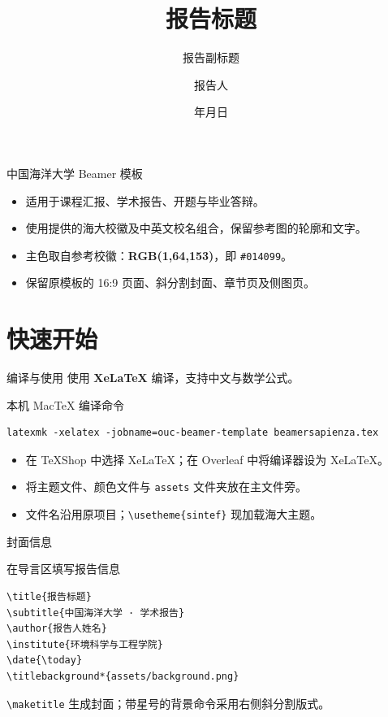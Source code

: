 \documentclass{beamer}
\title{报告标题}
\subtitle{报告副标题}
\author{报告人}
\institute{环境科学与工程学院}
\date{\number\year 年\number\month 月\number\day 日}
\begin{document}
\maketitle

\begin{frame}{中国海洋大学 Beamer 模板}
\begin{itemize}
  \item 适用于课程汇报、学术报告、开题与毕业答辩。
  \item 使用提供的海大校徽及中英文校名组合，保留参考图的轮廓和文字。
  \item 主色取自参考校徽：\textbf{RGB(1,64,153)}，即 \texttt{\#014099}。
  \item 保留原模板的 16:9 页面、斜分割封面、章节页及侧图页。
\end{itemize}
\end{frame}

\section{快速开始}

\begin{frame}[fragile]{编译与使用}
使用 \textbf{XeLaTeX} 编译，支持中文与数学公式。
\begin{block}{本机 MacTeX 编译命令}
\begin{verbatim}
latexmk -xelatex -jobname=ouc-beamer-template beamersapienza.tex
\end{verbatim}
\end{block}
\begin{itemize}
  \item 在 TeXShop 中选择 XeLaTeX；在 Overleaf 中将编译器设为 XeLaTeX。
  \item 将主题文件、颜色文件与 \texttt{assets} 文件夹放在主文件旁。
  \item 文件名沿用原项目；\verb|\usetheme{sintef}| 现加载海大主题。
\end{itemize}
\end{frame}

\begin{frame}[fragile]{封面信息}
\begin{block}{在导言区填写报告信息}
\begin{verbatim}
\title{报告标题}
\subtitle{中国海洋大学 · 学术报告}
\author{报告人姓名}
\institute{环境科学与工程学院}
\date{\today}
\titlebackground*{assets/background.png}
\end{verbatim}
\end{block}
\verb|\maketitle| 生成封面；带星号的背景命令采用右侧斜分割版式。
\end{frame}
\end{document}

